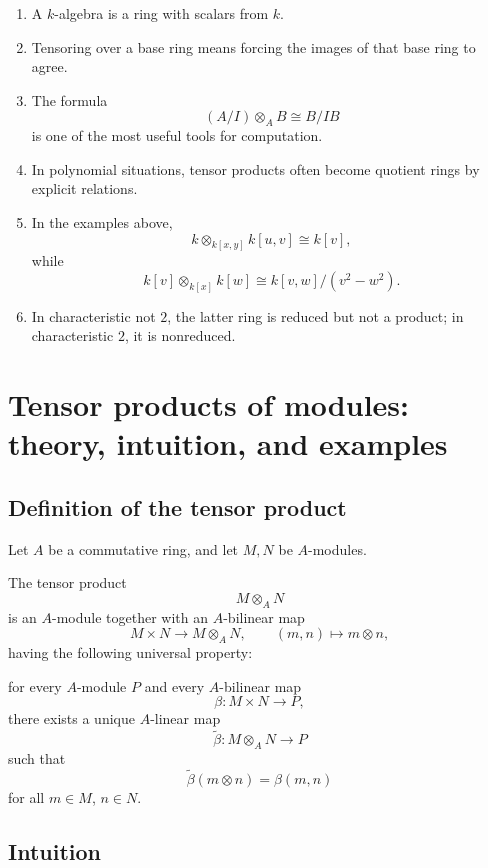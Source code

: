 \documentclass[12pt,a4paper]{article}
\theoremstyle{notespace}
\begin{document}
\begin{enumerate}
	\item A \(k\)-algebra is a ring with scalars from \(k\).
	
	\item Tensoring over a base ring means forcing the images of that base ring to agree.
	
	\item The formula
	\[
	(A/I)\otimes_A B \cong B/IB
	\]
	is one of the most useful tools for computation.
	
	\item In polynomial situations, tensor products often become quotient rings by explicit relations.
	
	\item In the examples above,
	\[
	k\otimes_{k[x,y]} k[u,v]\cong k[v],
	\]
	while
	\[
	k[v]\otimes_{k[x]} k[w]\cong k[v,w]/(v^2-w^2).
	\]
	
	\item In characteristic not \(2\), the latter ring is reduced but not a product; in characteristic \(2\), it is nonreduced.
\end{enumerate}

\section{Tensor products of modules: theory, intuition, and examples}

\subsection{Definition of the tensor product}

Let \(A\) be a commutative ring, and let \(M,N\) be \(A\)-modules.

The tensor product
\[
M\otimes_A N
\]
is an \(A\)-module together with an \(A\)-bilinear map
\[
M\times N \longrightarrow M\otimes_A N,
\qquad
(m,n)\longmapsto m\otimes n,
\]
having the following universal property:

for every \(A\)-module \(P\) and every \(A\)-bilinear map
\[
\beta:M\times N\to P,
\]
there exists a unique \(A\)-linear map
\[
\widetilde\beta:M\otimes_A N\to P
\]
such that
\[
\widetilde\beta(m\otimes n)=\beta(m,n)
\]
for all \(m\in M\), \(n\in N\).

\subsection{Intuition}
\end{document}
